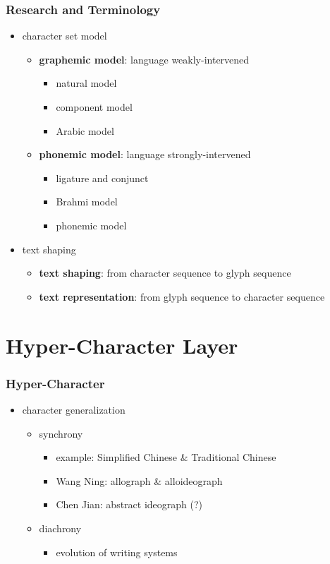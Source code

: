 \documentclass{beamer}
\begin{document}
	\begin{frame}
		\frametitle{Research and Terminology}

		\begin{itemize}
			\item character set model
			\begin{itemize}
                \item \textbf{graphemic model}: language weakly-intervened
				\begin{itemize}
					\item natural model
					\item component model
					\item Arabic model
				\end{itemize}
				\item \textbf{phonemic model}: language strongly-intervened
				\begin{itemize}
					\item ligature and conjunct
					\item Brahmi model
					\item phonemic model
				\end{itemize}
			\end{itemize}
			\item text shaping
			\begin{itemize}
				\item \textbf{text shaping}: from character sequence to glyph sequence
				\item \textbf{text representation}: from glyph sequence to character sequence
            \end{itemize}
        \end{itemize}
	\end{frame}

    \section{Hyper-Character Layer}

	\begin{frame}
		\frametitle{Hyper-Character}
		
		\begin{itemize}
			\item character generalization
			\begin{itemize}
                \item synchrony
                \begin{itemize}
					\item example: Simplified Chinese \& Traditional Chinese
					\item Wang Ning: allograph \& alloideograph
					\item Chen Jian: abstract ideograph (?)
				\end{itemize}
                \item diachrony
                \begin{itemize}
					\item evolution of writing systems
				\end{itemize}
            \end{itemize}
		\end{itemize}
	\end{frame}
\end{document}
